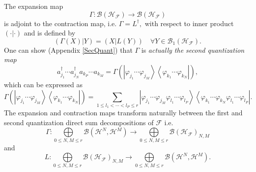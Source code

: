 \documentclass[aps,preprint]{revtex4}%
\begin{document}
The expansion map
\begin{equation}
\Gamma:\mathcal{B}\left(  \mathcal{H}_{\mathcal{F}}\right)  \rightarrow
\mathcal{B}\left(  \mathcal{H}_{\mathcal{F}}\right)
\end{equation}
is adjoint to the contraction map, i.e. $\Gamma=L^{\dagger},$ with respect to
inner product $\left(  \cdot\left\vert \cdot\right.  \right)  $ and is defined
by
\begin{equation}
\left(  \Gamma\left(  X\right)  \left\vert Y\right.  \right)  =\left(
X\left\vert L\left(  Y\right)  \right.  \right)  \quad\forall Y\in
\mathcal{B}_{1}\left(  \mathcal{H}_{\mathcal{F}}\right)  .
\end{equation}
One can show (Appendix \ref{SecQuant}) that $\Gamma$ is \emph{actually the
second quantization map}
\begin{equation}
a_{j_{1}}^{\dagger}\cdots a_{j_{N}}^{\dagger}a_{k_{P}}\cdots a_{k_{M}}%
=\Gamma\left(  \left\vert \varphi_{j_{1}}\cdots\varphi_{j_{M}}\right\rangle
\left\langle \varphi_{k_{1}}\cdots\varphi_{k_{N}}\right\vert \right)  ,
\end{equation}
which can be expressed as
\begin{equation}
\Gamma\left(  \left\vert \varphi_{j_{1}}\cdots\varphi_{j_{M}}\right\rangle
\left\langle \varphi_{k_{1}}\cdots\varphi_{k_{N}}\right\vert \right)
=\sum_{1\leq l_{1}<\cdots<l_{P}\leq r}\left\vert \varphi_{j_{1}}\cdots
\varphi_{j_{M}}\varphi_{l_{1}}\cdots\varphi_{l_{P}}\right\rangle \left\langle
\varphi_{k_{1}}\cdots\varphi_{k_{N}}\varphi_{l_{1}}\cdots\varphi_{l_{P}%
}\right\vert .
\end{equation}
The expansion and contraction maps transform naturally between the first and
second quantization direct sum decompositions of $\mathcal{F}$ i.e.
\begin{equation}
\Gamma:%
{\displaystyle\bigoplus\limits_{0\leq N,M\leq r}}
\mathcal{B}\left(  \mathcal{H}^{N},\mathcal{H}^{M}\right)  \rightarrow%
{\displaystyle\bigoplus\limits_{0\leq N,M\leq r}}
\mathcal{B}\left(  \mathcal{H}_{\mathcal{F}}\right)  _{N,M}%
\end{equation}
and
\begin{equation}
L:%
{\displaystyle\bigoplus\limits_{0\leq N,M\leq r}}
\mathcal{B}\left(  \mathcal{H}_{\mathcal{F}}\right)  _{N,M}\rightarrow%
{\displaystyle\bigoplus\limits_{0\leq N,M\leq r}}
\mathcal{B}\left(  \mathcal{H}^{N},\mathcal{H}^{M}\right)  .
\end{equation}
\end{document}
